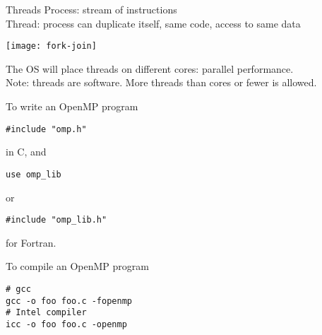 


\begin{frame}{Threads}
  Process: stream of instructions\\
  Thread: process can duplicate itself, same code, access to same data

  \texttt{[image: fork-join]}

  The OS will place threads on different cores: parallel
  performance.\\
  Note: threads are software. More threads than cores or fewer is allowed.
\end{frame}

\begin{frame}[containsverbatim]{To write an OpenMP program}
\begin{verbatim}
#include "omp.h"
\end{verbatim}
in C, and 
\begin{verbatim}
use omp_lib
\end{verbatim}
or
\begin{verbatim}
#include "omp_lib.h"
\end{verbatim}
for Fortran.  
\end{frame}

\begin{frame}[containsverbatim]{To compile an OpenMP program}
\begin{verbatim}
# gcc
gcc -o foo foo.c -fopenmp
# Intel compiler
icc -o foo foo.c -openmp
\end{verbatim}
\end{frame}

